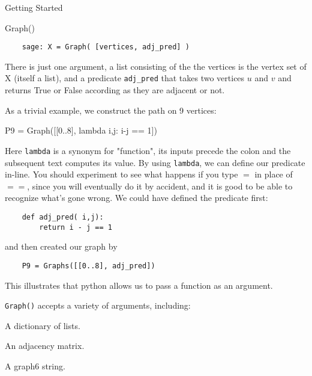 \begin{chap}{Getting Started}
\begin{sect}{Graph()}
\begin{para}
\end{para}
%
\begin{verbatim}
    sage: X = Graph( [vertices, adj_pred] )
\end{verbatim}
%
\begin{para}
There is just one argument, a list consisting of the
the vertices is the vertex set of X (itself a list), and a predicate
\verb|adj_pred| that takes two vertices $u$ and $v$ and returns True or
False according as they are adjacent or not.
\end{para}
%
\begin{para}
As a trivial example, we construct the path on 9 vertices:
\end{para}
%
\begin{sageblock}
P9 = Graph([[0..8], lambda i,j: i-j == 1])
\end{sageblock}
%
\begin{para}
Here \verb|lambda| is a synonym for "function", its inputs precede the colon
and the subsequent text computes its value. By using \verb|lambda|, we can define
our predicate in-line. You should experiment to see what happens if you type 
$=$ in place of $==$, since you will eventually do it by accident, and it is good to
be able to recognize what's gone wrong.
We could have defined the predicate first:
\end{para}
%
\begin{verbatim}
    def adj_pred( i,j):
        return i - j == 1
\end{verbatim}
%
\begin{para}
and then created our graph by
\end{para}
%
\begin{verbatim}
    P9 = Graphs([[0..8], adj_pred])
\end{verbatim}
%
\begin{para}
This illustrates that python allows us to pass a function as an argument.
\end{para}
%
\begin{para}
\verb|Graph()| accepts a variety of arguments, including:
\begin{enumerate}
    \begin{listitem}A dictionary of lists.\end{listitem}
    \begin{listitem}An adjacency matrix.\end{listitem}
    \begin{listitem}A graph6 string.\end{listitem}
\end{enumerate}

\end{para}
\end{sect}
\end{chap}
